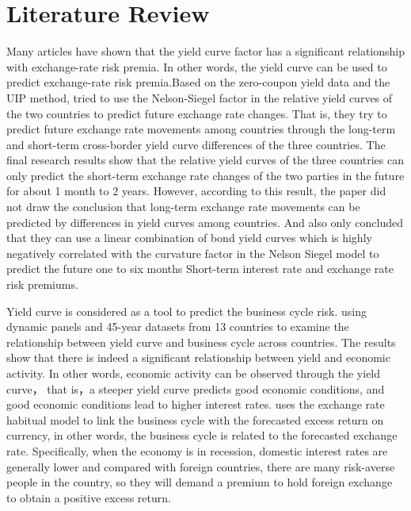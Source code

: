 \documentclass[10pt]{article}
\begin{document}
\section{Literature Review}
Many articles have shown that the yield curve factor has a significant relationship with exchange-rate risk premia. In other words, the yield curve can be used to predict exchange-rate risk premia.Based on the zero-coupon yield data and the UIP method, \cite{chen2013does} tried to use the Nelson-Siegel factor in the relative yield curves of the two countries to predict future exchange rate changes. That is, they try to predict future exchange rate movements among countries through the long-term and short-term cross-border yield curve differences of the three countries. The final research results show that the relative yield curves of the three countries can only predict the short-term exchange rate changes of the two parties in the future for about 1 month to 2 years. However, according to this result, the paper did not draw the conclusion that long-term exchange rate movements can be predicted by differences in yield curves among countries. And \cite{grab2018predicting} also only concluded that they can use a linear combination of bond yield curves which is highly negatively correlated with the curvature factor in the Nelson Siegel model to predict the future one to six months Short-term interest rate and exchange rate risk premiums. 

Yield curve is considered as a tool to predict the business cycle risk. \cite{hasse2022does} using dynamic panels and 45-year datasets from 13 countries to examine the relationship between yield curve and business cycle across countries. The results show that there is indeed a significant relationship between yield and economic activity. In other words, economic activity can be observed through the yield curve， that is，a steeper yield curve predicts good economic conditions, and good economic conditions lead to higher interest rates. \cite{riddiough2018business} uses the exchange rate habitual model to link the business cycle with the forecasted excess return on currency, in other words, the business cycle is related to the forecasted exchange rate. Specifically, when the economy is in recession, domestic interest rates are generally lower and compared with foreign countries, there are many risk-averse people in the country, so they will demand a premium to hold foreign exchange to obtain a positive excess return.
\end{document}
